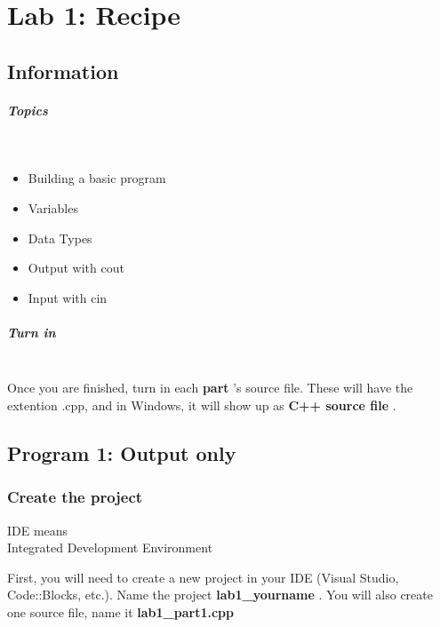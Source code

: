 \documentclass[a4paper,12pt]{book}
\title{}
\author{Rachel Morris}
\date{\today}
\begin{document}
    \chapter*{Lab 1: Recipe} 
        \section*{Information}

                \paragraph*{ Topics } ~\\
                    \begin{itemize}
                        \item Building a basic program
                        \item Variables
                        \item Data Types
                        \item Output with cout
                        \item Input with cin
                    \end{itemize}
                    
                \paragraph*{ Turn in } ~\\
                    Once you are finished, turn in each \textbf{ part }'s source file. These will
                    have the extention .cpp, and in Windows, it will show up as \textbf{ C++ source file }.

        \section*{ Program 1: Output only }
            \subsection*{ Create the project }

\begin{WrapTextSide}
    IDE means \\ Integrated Development Environment
\end{WrapTextSide}
            
                First, you will need to create a new project in your IDE (Visual Studio, Code::Blocks, etc.).
                Name the project \textbf{ lab1\_yourname }. You will also create one source file,
                name it \textbf{ lab1\_part1.cpp } \\
\end{document}
